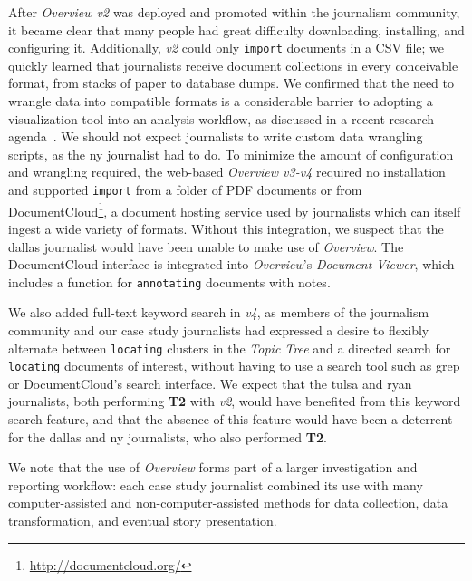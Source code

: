 After {\it Overview v2} was deployed and promoted within the journalism community, it became clear that many people had great difficulty downloading, installing, and configuring it.
Additionally, {\it v2} could only {\tt import} documents in a \ac{CSV} file; we quickly learned that journalists receive document collections in every conceivable format, from stacks of paper to database dumps.
We confirmed that the need to wrangle data into compatible formats is a considerable barrier to adopting a visualization tool into an analysis workflow, as discussed in a recent research agenda~\cite{Kandel2011}.
We should not expect journalists to write custom data wrangling scripts, as the {\sc ny} journalist had to do.
To minimize the amount of configuration and wrangling required, the web-based {\it Overview v3-v4} required no installation and supported {\tt import} from a folder of \ac{PDF} documents or from DocumentCloud\footnote{\url{http://documentcloud.org/}}, a document hosting service used by journalists which can itself ingest a wide variety of formats.
Without this integration, we suspect that the {\sc dallas} journalist would have been unable to make use of {\it Overview}.
The DocumentCloud interface is integrated into {\it Overview}'s {\it Document Viewer}, which includes a function for {\tt annotating} documents with notes. 

We also added full-text keyword search in {\it v4}, as members of the journalism community and our case study journalists had expressed a desire to flexibly alternate between {\tt locating} clusters in the {\it Topic Tree} and a directed search for {\tt locating} documents of interest, without having to use a search tool such as grep or DocumentCloud's search interface. 
We expect that the {\sc tulsa} and {\sc ryan} journalists, both performing {\bf T2} with {\it v2}, would have benefited from this keyword search feature, and that the absence of this feature would have been a deterrent for the {\sc dallas} and {\sc ny} journalists, who also performed {\bf T2}.

We note that the use of {\it Overview} forms part of a larger investigation and reporting workflow: each case study journalist combined its use with many computer-assisted and non-computer-assisted methods for data collection, data transformation, and eventual story presentation.

